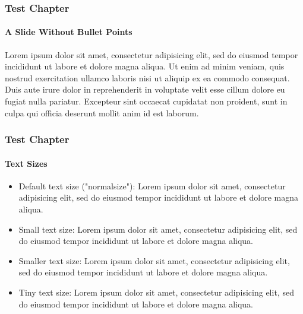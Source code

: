 \begin{frame}
	\frametitle{Test Chapter}
	\framesubtitle{A Slide Without Bullet Points}

	Lorem ipsum dolor sit amet, consectetur adipisicing elit, sed do eiusmod
	tempor incididunt ut labore et dolore magna aliqua. Ut enim ad minim veniam,
	quis nostrud exercitation ullamco laboris nisi ut aliquip ex ea commodo
	consequat. Duis aute irure dolor in reprehenderit in voluptate velit esse
	cillum dolore eu fugiat nulla pariatur. Excepteur sint occaecat cupidatat
	non proident, sunt in culpa qui officia deserunt mollit anim id est laborum.

	\breakingchange

\end{frame}


\begin{frame}
	\frametitle{Test Chapter}
	\framesubtitle{Text Sizes}

	\begin{itemize}
		\item Default text size ("normalsize"):\newline
			Lorem ipsum dolor sit amet, consectetur adipisicing elit, sed do eiusmod tempor incididunt ut labore et dolore magna aliqua.

		\item Small text size:\newline
			\small
				Lorem ipsum dolor sit amet, consectetur adipisicing elit, sed do eiusmod tempor incididunt ut labore et dolore magna aliqua.
			\normalsize

		\item Smaller text size:\newline
			\smaller
				Lorem ipsum dolor sit amet, consectetur adipisicing elit, sed do eiusmod tempor incididunt ut labore et dolore magna aliqua.
			\normalsize

		\item Tiny text size:\newline
			\tiny
				Lorem ipsum dolor sit amet, consectetur adipisicing elit, sed do eiusmod tempor incididunt ut labore et dolore magna aliqua.
			\normalsize

	\end{itemize}
\end{frame}


